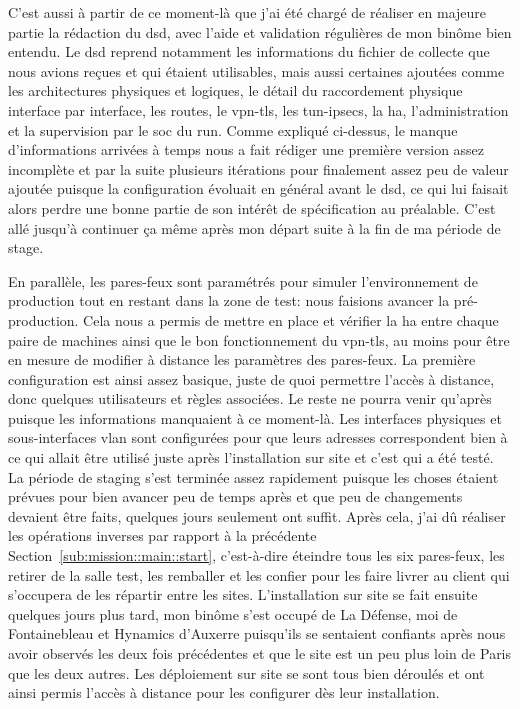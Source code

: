 \documentclass[12pt, oneside, a4paper, titlepage]{report}
\begin{document}
C'est aussi à partir de ce moment-là que j'ai été chargé de réaliser en majeure
partie la rédaction du \acrfull{dsd}, avec l'aide et validation régulières de
mon binôme bien entendu. Le \gls{dsd} reprend notamment les informations du
fichier de collecte que nous avions reçues et qui étaient utilisables, mais
aussi certaines ajoutées comme les architectures physiques et logiques, le
détail du raccordement physique interface par interface, les routes, le
\gls{vpn-tls}, les \glspl{tun-ipsec}, la \acrfull{ha}, l'administration et la
supervision par le \gls{soc} du \gls{run}. Comme expliqué ci-dessus, le manque
d'informations arrivées à temps nous a fait rédiger une première version assez
incomplète et par la suite plusieurs itérations pour finalement assez peu de
valeur ajoutée puisque la configuration évoluait en général avant le \gls{dsd},
ce qui lui faisait alors perdre une bonne partie de son intérêt de spécification
au préalable. C'est allé jusqu'à continuer ça même après mon départ suite à la
fin de ma période de stage.

En parallèle, les pares-feux sont paramétrés pour simuler l'environnement de
production tout en restant dans la zone de test: nous faisions avancer la
pré-production. Cela nous a permis de mettre en place et vérifier la \gls{ha}
entre chaque paire de machines ainsi que le bon fonctionnement du \gls{vpn-tls},
au moins pour être en mesure de modifier à distance les paramètres des
pares-feux. La première configuration est ainsi assez basique, juste de quoi
permettre l'accès à distance, donc quelques utilisateurs et règles associées. Le
reste ne pourra venir qu'après puisque les informations manquaient à ce
moment-là. Les interfaces physiques et sous-interfaces \gls{vlan} sont
configurées pour que leurs adresses correspondent bien à ce qui allait être
utilisé juste après l'installation sur site et c'est qui a été testé. La période
de \gls{staging} s'est terminée assez rapidement puisque les choses étaient
prévues pour bien avancer peu de temps après et que peu de changements devaient
être faits, quelques jours seulement ont suffit. Après cela, j'ai dû réaliser
les opérations inverses par rapport à la précédente
Section~\ref{sub:mission::main::start}, c'est-à-dire éteindre tous les six
pares-feux, les retirer de la salle test, les remballer et les confier pour les
faire livrer au client qui s'occupera de les répartir entre les sites.
L'installation sur site se fait ensuite quelques jours plus tard, mon binôme
s'est occupé de La Défense, moi de Fontainebleau et Hynamics d'Auxerre
puisqu'ils se sentaient confiants après nous avoir observés les deux fois
précédentes et que le site est un peu plus loin de Paris que les deux autres.
Les déploiement sur site se sont tous bien déroulés et ont ainsi permis l'accès
à distance pour les configurer dès leur installation.
\end{document}
